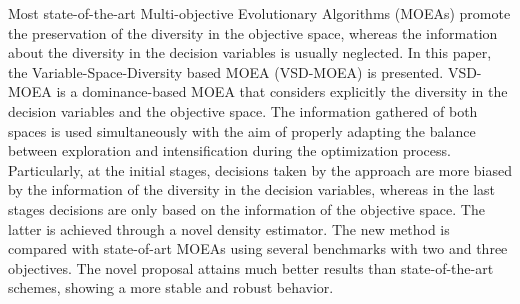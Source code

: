 Most state-of-the-art Multi-objective Evolutionary Algorithms (MOEAs) promote the preservation of the diversity 
in the objective space, whereas the information about the diversity in the decision variables is usually neglected.
%
In this paper, the Variable-Space-Diversity based MOEA (VSD-MOEA) is presented.
%
VSD-MOEA is a dominance-based MOEA that considers explicitly the diversity in the decision variables and the objective space.
%
The information gathered of both spaces is used simultaneously with the aim of properly adapting the balance between exploration
and intensification during the optimization process.
%
Particularly, at the initial stages, decisions taken by the approach are more biased by the information of the diversity in 
the decision variables, whereas in the last stages decisions are only based on the information of the objective space.
%
The latter is achieved through a novel density estimator.
%
The new method is compared with state-of-art MOEAs using several benchmarks with two and three objectives.
%
The novel proposal attains much better results than state-of-the-art schemes, showing a more stable 
and robust behavior.
